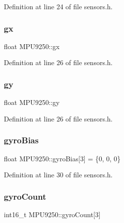 Definition at line 24 of file sensors.\+h.

\mbox{\label{classMPU9250_a59b6d7bd37738bac258da24ad330feef}} 
\subsubsection{\texorpdfstring{gx}{gx}}
{\footnotesize\ttfamily float M\+P\+U9250\+::gx}



Definition at line 26 of file sensors.\+h.

\mbox{\label{classMPU9250_a126311c382d2667b7bc7cbe1f9b38b51}} 
\subsubsection{\texorpdfstring{gy}{gy}}
{\footnotesize\ttfamily float M\+P\+U9250\+::gy}



Definition at line 26 of file sensors.\+h.

\mbox{\label{classMPU9250_a4fc2232b3fdbd61bc1024c86842ddf9a}} 
\subsubsection{\texorpdfstring{gyro\+Bias}{gyroBias}}
{\footnotesize\ttfamily float M\+P\+U9250\+::gyro\+Bias\mbox{[}3\mbox{]} = \{0, 0, 0\}}



Definition at line 30 of file sensors.\+h.

\mbox{\label{classMPU9250_a14ab2e2ab741ca245007cb9a134e07f3}} 
\subsubsection{\texorpdfstring{gyro\+Count}{gyroCount}}
{\footnotesize\ttfamily int16\+\_\+t M\+P\+U9250\+::gyro\+Count\mbox{[}3\mbox{]}}



